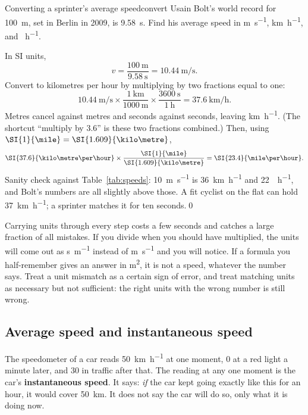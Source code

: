 \begin{example}{Converting a sprinter's average speed}{convert}
Usain Bolt's world record for \SI{100}{\metre}, set in Berlin in 2009, is \SI{9.58}{\second}. Find his average speed in \si{\metre\per\second}, \si{\kilo\metre\per\hour}, and \si{\mile\per\hour}.

\solution In SI units,
\[
v = \frac{\SI{100}{\metre}}{\SI{9.58}{\second}} = \SI{10.44}{\metre\per\second}.
\]
Convert to kilometres per hour by multiplying by two fractions equal to one:
\[
\SI{10.44}{\metre\per\second} \times \frac{\SI{1}{\kilo\metre}}{\SI{1000}{\metre}} \times \frac{\SI{3600}{\second}}{\SI{1}{\hour}} = \SI{37.6}{\kilo\metre\per\hour}.
\]
Metres cancel against metres and seconds against seconds, leaving \si{\kilo\metre\per\hour}. (The shortcut ``multiply by \num{3.6}'' is these two fractions combined.) Then, using $\SI{1}{\mile} = \SI{1.609}{\kilo\metre}$,
\[
\SI{37.6}{\kilo\metre\per\hour} \times \frac{\SI{1}{\mile}}{\SI{1.609}{\kilo\metre}} = \SI{23.4}{\mile\per\hour}.
\]
Sanity check against Table~\ref{tab:speeds}: \SI{10}{\metre\per\second} is \SI{36}{\kilo\metre\per\hour} and \SI{22}{\mile\per\hour}, and Bolt's numbers are all slightly above those. A fit cyclist on the flat can hold \SI{37}{\kilo\metre\per\hour}; a sprinter matches it for ten seconds.\qed
\end{example}

\begin{modelnote}
Carrying units through every step costs a few seconds and catches a large fraction of all mistakes. If you divide when you should have multiplied, the units will come out as \si{\second\per\metre} instead of \si{\metre\per\second} and you will notice. If a formula you half-remember gives an answer in \si{\metre\squared}, it is not a speed, whatever the number says. Treat a unit mismatch as a certain sign of error, and treat matching units as necessary but not sufficient: the right units with the wrong number is still wrong.
\end{modelnote}

\subsection{Average speed and instantaneous speed}
\label{sec:instant}

The speedometer of a car reads \SI{50}{\kilo\metre\per\hour} at one moment, \num{0} at a red light a minute later, and \num{30} in traffic after that. The reading at any one moment is the car's \textbf{instantaneous speed}. It says: \emph{if} the car kept going exactly like this for an hour, it would cover \SI{50}{\kilo\metre}. It does not say the car will do so, only what it is doing now.


